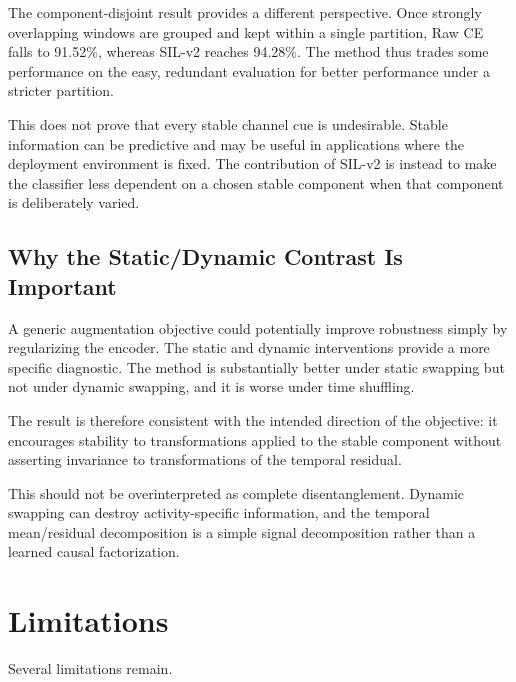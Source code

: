 \documentclass[runningheads]{llncs}
\newcommand{\method}{SIL-v2}
\begin{document}
The component-disjoint result provides a different perspective. Once strongly overlapping windows are grouped and kept within a single partition, Raw CE falls to 91.52\%, whereas \method{} reaches 94.28\%. The method thus trades some performance on the easy, redundant evaluation for better performance under a stricter partition.

This does not prove that every stable channel cue is undesirable. Stable information can be predictive and may be useful in applications where the deployment environment is fixed. The contribution of \method{} is instead to make the classifier less dependent on a chosen stable component when that component is deliberately varied.

\subsection{Why the Static/Dynamic Contrast Is Important}

A generic augmentation objective could potentially improve robustness simply by regularizing the encoder. The static and dynamic interventions provide a more specific diagnostic. The method is substantially better under static swapping but not under dynamic swapping, and it is worse under time shuffling.

The result is therefore consistent with the intended direction of the objective: it encourages stability to transformations applied to the stable component without asserting invariance to transformations of the temporal residual.

This should not be overinterpreted as complete disentanglement. Dynamic swapping can destroy activity-specific information, and the temporal mean/residual decomposition is a simple signal decomposition rather than a learned causal factorization.

\section{Limitations}

Several limitations remain.
\end{document}
